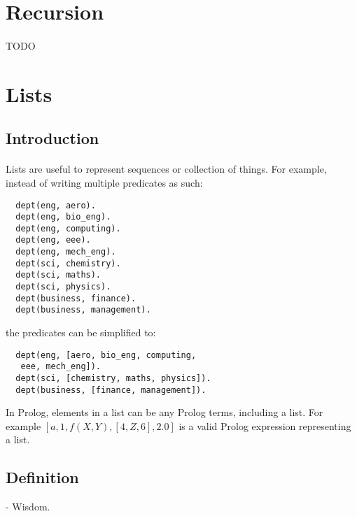 \documentclass{article}
\begin{document}
\begin{multicols}{2}
  \section{Recursion}
  
  \paragraph{} TODO
  
  \section{Lists}  
  
  \subsection{Introduction}
  
  \paragraph{} Lists are useful to represent sequences or collection of things. For example, instead of writing multiple predicates as such:
  
  \begin{lstlisting}
  dept(eng, aero).
  dept(eng, bio_eng).
  dept(eng, computing).
  dept(eng, eee).
  dept(eng, mech_eng).
  dept(sci, chemistry).
  dept(sci, maths).
  dept(sci, physics).
  dept(business, finance).
  dept(business, management).
  \end{lstlisting}
  
  the predicates can be simplified to:
  
  \begin{lstlisting}
  dept(eng, [aero, bio_eng, computing,
   eee, mech_eng]).
  dept(sci, [chemistry, maths, physics]).
  dept(business, [finance, management]).
  \end{lstlisting}
  
  In Prolog, elements in a list can be any Prolog terms, including a list. For example $[a, 1, f(X, Y), [4, Z, 6], 2.0]$ is a valid Prolog expression representing a list.
  
  \subsection{Definition}
  
   - Wisdom.
  

\end{multicols}
\end{document}
